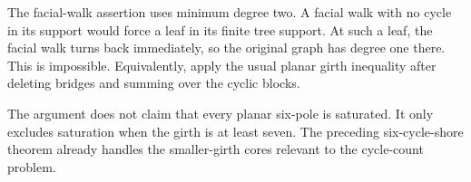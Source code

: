 The facial-walk assertion uses minimum degree two.
A facial walk with no cycle in its support would force a leaf in its finite tree support.
At such a leaf, the facial walk turns back immediately, so the original graph has degree one there.
This is impossible.
Equivalently, apply the usual planar girth inequality after deleting bridges and summing over the cyclic blocks.

\begin{remark}[Scope]
The argument does not claim that every planar six-pole is saturated.
It only excludes saturation when the girth is at least seven.
The preceding six-cycle-shore theorem already handles the smaller-girth cores relevant to the cycle-count problem.
\end{remark}
